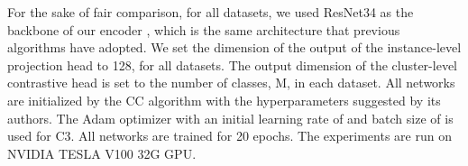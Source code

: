 \documentclass{bmvc2k}
\newcommand{\shadow}[1]{}
\def\s{\shadow}
\begin{document}
For the sake of fair comparison, for all datasets, we used ResNet34 \cite{resnet} as the backbone of our encoder , which is the same architecture that previous algorithms have adopted. We set the dimension of the output of the instance-level projection head  to 128, for all datasets. The output dimension of the cluster-level contrastive head is set to the number of classes, M, in each dataset. All networks are initialized by the CC \cite{CC} algorithm with the hyperparameters suggested by its authors. The Adam optimizer with an initial learning rate of   and batch size of  is used for C3. All networks are trained for 20 epochs.\s{Like CC, we set the temperature parameters of instance-level and clustering-level networks to  and , respectively. Like CC, for training the first step, we used Adam optimizer \cite{kingma:adam} with  , batch size of  and  epochs. Also, the Adam optimizer with an initial learning rate of  and batch size of  is used in the second step, and the networks are trained for  epochs.} The experiments are run on NVIDIA TESLA V100 32G GPU.
\vspace{-4mm}
\end{document}
